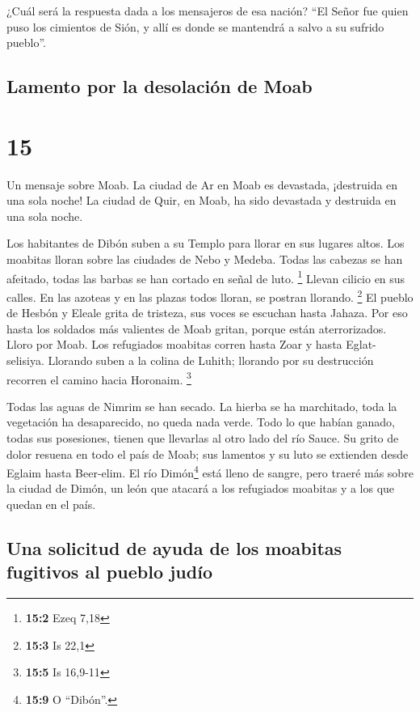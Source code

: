  ¿Cuál será la respuesta dada a los mensajeros de esa
nación? ``El Señor fue quien puso los cimientos de Sión, y allí es donde
se mantendrá a salvo a su sufrido pueblo''.

\hypertarget{lamento-por-la-desolaciuxf3n-de-moab}{%
\subsection{Lamento por la desolación de
Moab}\label{lamento-por-la-desolaciuxf3n-de-moab}}

\hypertarget{section-14}{%
\section{15}\label{section-14}}

 Un mensaje sobre Moab. La ciudad de Ar en Moab es
devastada, ¡destruida en una sola noche! La ciudad de Quir, en Moab, ha
sido devastada y destruida en una sola noche.

 Los habitantes de Dibón suben a su Templo para llorar en
sus lugares altos. Los moabitas lloran sobre las ciudades de Nebo y
Medeba. Todas las cabezas se han afeitado, todas las barbas se han
cortado en señal de luto. \footnote{\textbf{15:2} Ezeq 7,18}
 Llevan cilicio en sus calles. En las azoteas y en las
plazas todos lloran, se postran llorando. \footnote{\textbf{15:3} Is
  22,1}  El pueblo de Hesbón y Eleale grita de tristeza,
sus voces se escuchan hasta Jahaza. Por eso hasta los soldados más
valientes de Moab gritan, porque están aterrorizados. 
Lloro por Moab. Los refugiados moabitas corren hasta Zoar y hasta
Eglat-selisiya. Llorando suben a la colina de Luhith; llorando por su
destrucción recorren el camino hacia Horonaim. \footnote{\textbf{15:5}
  Is 16,9-11}

 Todas las aguas de Nimrim se han secado. La hierba se ha
marchitado, toda la vegetación ha desaparecido, no queda nada verde.
 Todo lo que habían ganado, todas sus posesiones, tienen
que llevarlas al otro lado del río Sauce.  Su grito de
dolor resuena en todo el país de Moab; sus lamentos y su luto se
extienden desde Eglaim hasta Beer-elim.  El río
Dimón\footnote{\textbf{15:9} O ``Dibón''.} está lleno de sangre, pero
traeré más sobre la ciudad de Dimón, un león que atacará a los
refugiados moabitas y a los que quedan en el país.

\hypertarget{una-solicitud-de-ayuda-de-los-moabitas-fugitivos-al-pueblo-juduxedo}{%
\subsection{Una solicitud de ayuda de los moabitas fugitivos al pueblo
judío}\label{una-solicitud-de-ayuda-de-los-moabitas-fugitivos-al-pueblo-juduxedo}}

